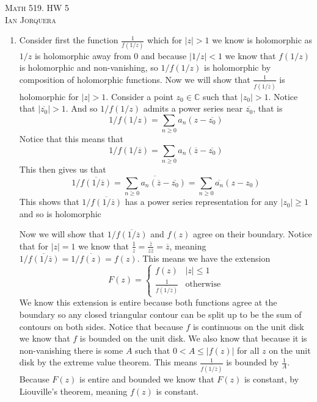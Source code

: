 \documentclass[12pt]{amsart}
\theoremstyle{definition}
\newcommand{\C}{\mathbb{C}}
\begin{document}
\begin{center}
    \textsc{Math 519. HW 5\\ Ian Jorquera}
\end{center}
\vspace{1em}

\begin{enumerate}
\item Consider first the function $\frac{1}{f(1/z)}$ which for $|z|>1$ we know is holomorphic as $1/z$ is holomorphic away from $0$ and because $|1/z|<1$ we know that $f(1/z)$ is holomorphic and non-vanishing, so $1/f(1/z)$ is holomorphic by composition of holomorphic functions. Now we will show that $\frac{1}{\overline{f(1/\overline{z})}}$ is holomorphic for $|z|> 1$. Consider a point $z_0\in \C$ such that $|z_0|> 1$. Notice that $|\overline{z_0}|> 1$. And so $1/f(1/z)$ admits a power series near $\overline{z_0}$, that is $$1/f(1/z)=\sum_{n\geq 0}a_n(z-\overline{z_0})$$ Notice that this means that $$1/f(1/\overline{z})=\sum_{n\geq 0}a_n(\overline{z}-\overline{z_0})$$
This then gives us that $$1/\overline{f(1/\overline{z})}=\overline{\sum_{n\geq 0}a_n(\overline{z}-\overline{z_0})}=\sum_{n\geq 0}\overline{a_n}({z}-{z_0})$$ This shows that $1/\overline{f(1/\overline{z})}$ has a power series representation for any $|z_0|\geq 1$ and so is holomorphic

Now we will show that $1/\overline{f(1/\overline{z})}$ and $f(z)$ agree on their boundary. Notice that for $|z|=1$ we know that $\frac{1}{z}=\frac{\overline{z}}{z\overline{z}}=\overline{z}$, meaning $1/\overline{f(1/\overline{z})}=1/\overline{f(z)}=f(z)$. This means we have the extension 
$$F(z)=\begin{cases}f(z) & |z|\leq 1\\
\frac{1}{\overline{f(1/\overline{z})}}&\text{otherwise}\end{cases}$$
We know this extension is entire because both functions agree at the boundary so any closed triangular contour can be split up to be the sum of contours on both sides.
Notice that because $f$ is continuous on the unit disk we know that $f$ is bounded on the unit disk. We also know that because it is non-vanishing there is some $A$ such that $0<A\leq |f(z)|$ for all $z$ on the unit disk by the extreme value theorem. This means $\frac{1}{\overline{f(1/\overline{z})}}$ is bounded by $\frac{1}{A}$. Because $F(z)$ is entire and bounded we know that $F(z)$ is constant, by Liouville's theorem, meaning $f(z)$ is constant.\\


\end{enumerate}
\end{document}
